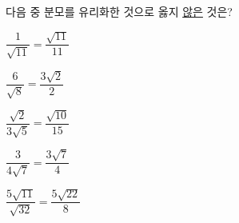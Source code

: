 다음 중 분모를 유리화한 것으로 옳지 \underline{않은} 것은?
\begin{choicesii}{\rule[-3ex]{0pt}{8ex}$\dfrac{1}{\sqrt{11}}=\dfrac{\sqrt{11}}{11}$}{\rule[-3ex]{0pt}{8ex}$\dfrac{6}{\sqrt{8}}=\dfrac{3\sqrt{2}}{2}$}{\rule[-3ex]{0pt}{8ex}$\dfrac{\sqrt{2}}{3\sqrt{5}}=\dfrac{\sqrt{10}}{15}$}{\rule[-3ex]{0pt}{8ex}$\dfrac{3}{4\sqrt{7}}=\dfrac{3\sqrt{7}}{4}$}{\rule[-3ex]{0pt}{8ex}$\dfrac{5\sqrt{11}}{\sqrt{32}}=\dfrac{5\sqrt{22}}{8}$}\end{choicesii}
